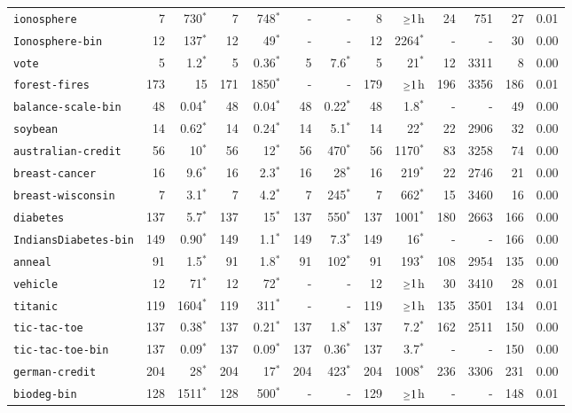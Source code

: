 \begin{tabular}{lrrrrrrrrrrrr}
\texttt{ionosphere} & 7 & 730$^*$ & 7 & 748$^*$ & - & - & 8 & $\mathsmaller{\geq}1$h & 24 & 751 & 27 & 0.01\\
\texttt{Ionosphere-bin} & 12 & 137$^*$ & 12 & 49$^*$ & - & - & 12 & 2264$^*$ & - & - & 30 & 0.00\\
\texttt{vote} & 5 & 1.2$^*$ & 5 & 0.36$^*$ & 5 & 7.6$^*$ & 5 & 21$^*$ & 12 & 3311 & 8 & 0.00\\
\texttt{forest-fires} & 173 & 15 & 171 & 1850$^*$ & - & - & 179 & $\mathsmaller{\geq}1$h & 196 & 3356 & 186 & 0.01\\
\texttt{balance-scale-bin} & 48 & 0.04$^*$ & 48 & 0.04$^*$ & 48 & 0.22$^*$ & 48 & 1.8$^*$ & - & - & 49 & 0.00\\
\texttt{soybean} & 14 & 0.62$^*$ & 14 & 0.24$^*$ & 14 & 5.1$^*$ & 14 & 22$^*$ & 22 & 2906 & 32 & 0.00\\
\texttt{australian-credit} & 56 & 10$^*$ & 56 & 12$^*$ & 56 & 470$^*$ & 56 & 1170$^*$ & 83 & 3258 & 74 & 0.00\\
\texttt{breast-cancer} & 16 & 9.6$^*$ & 16 & 2.3$^*$ & 16 & 28$^*$ & 16 & 219$^*$ & 22 & 2746 & 21 & 0.00\\
\texttt{breast-wisconsin} & 7 & 3.1$^*$ & 7 & 4.2$^*$ & 7 & 245$^*$ & 7 & 662$^*$ & 15 & 3460 & 16 & 0.00\\
\texttt{diabetes} & 137 & 5.7$^*$ & 137 & 15$^*$ & 137 & 550$^*$ & 137 & 1001$^*$ & 180 & 2663 & 166 & 0.00\\
\texttt{IndiansDiabetes-bin} & 149 & 0.90$^*$ & 149 & 1.1$^*$ & 149 & 7.3$^*$ & 149 & 16$^*$ & - & - & 166 & 0.00\\
\texttt{anneal} & 91 & 1.5$^*$ & 91 & 1.8$^*$ & 91 & 102$^*$ & 91 & 193$^*$ & 108 & 2954 & 135 & 0.00\\
\texttt{vehicle} & 12 & 71$^*$ & 12 & 72$^*$ & - & - & 12 & $\mathsmaller{\geq}1$h & 30 & 3410 & 28 & 0.01\\
\texttt{titanic} & 119 & 1604$^*$ & 119 & 311$^*$ & - & - & 119 & $\mathsmaller{\geq}1$h & 135 & 3501 & 134 & 0.01\\
\texttt{tic-tac-toe} & 137 & 0.38$^*$ & 137 & 0.21$^*$ & 137 & 1.8$^*$ & 137 & 7.2$^*$ & 162 & 2511 & 150 & 0.00\\
\texttt{tic-tac-toe-bin} & 137 & 0.09$^*$ & 137 & 0.09$^*$ & 137 & 0.36$^*$ & 137 & 3.7$^*$ & - & - & 150 & 0.00\\
\texttt{german-credit} & 204 & 28$^*$ & 204 & 17$^*$ & 204 & 423$^*$ & 204 & 1008$^*$ & 236 & 3306 & 231 & 0.00\\
\texttt{biodeg-bin} & 128 & 1511$^*$ & 128 & 500$^*$ & - & - & 129 & $\mathsmaller{\geq}1$h & - & - & 148 & 0.01\\

\end{tabular}
